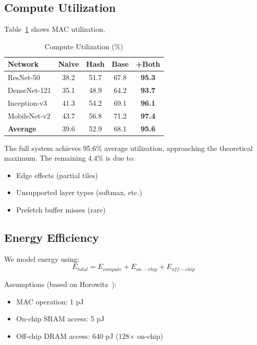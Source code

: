 \documentclass[journal]{IEEEtran}
\begin{document}
\subsection{Compute Utilization}

Table~\ref{tab:utilization} shows MAC utilization.

\begin{table}[t]
\centering
\caption{Compute Utilization (\%)}
\label{tab:utilization}
\small
\begin{tabular}{lcccc}
\toprule
\textbf{Network} & \textbf{Naive} & \textbf{Hash} & \textbf{Base} & \textbf{+Both} \\
\midrule
ResNet-50 & 38.2 & 51.7 & 67.8 & \textbf{95.3} \\
DenseNet-121 & 35.1 & 48.9 & 64.2 & \textbf{93.7} \\
Inception-v3 & 41.3 & 54.2 & 69.1 & \textbf{96.1} \\
MobileNet-v2 & 43.7 & 56.8 & 71.2 & \textbf{97.4} \\
\midrule
\textbf{Average} & 39.6 & 52.9 & 68.1 & \textbf{95.6} \\
\bottomrule
\end{tabular}
\end{table}

The full system achieves 95.6\% average utilization, approaching the theoretical maximum. The remaining 4.4\% is due to:
\begin{itemize}
\item Edge effects (partial tiles)
\item Unsupported layer types (softmax, etc.)
\item Prefetch buffer misses (rare)
\end{itemize}

\subsection{Energy Efficiency}

We model energy using:
\begin{equation}
E_{total} = E_{compute} + E_{on-chip} + E_{off-chip}
\end{equation}

Assumptions (based on Horowitz~\cite{horowitz20141}):
\begin{itemize}
\item MAC operation: 1 pJ
\item On-chip SRAM access: 5 pJ
\item Off-chip DRAM access: 640 pJ (128$\times$ on-chip)
\end{itemize}
\end{document}

